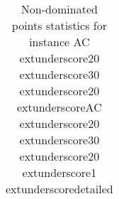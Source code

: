 \begin{table}
\caption{Non-dominated points statistics for instance AC	extunderscore20	extunderscore30	extunderscore20	extunderscoreAC	extunderscore20	extunderscore30	extunderscore20	extunderscore1	extunderscoredetailed}
\label{tab:stats/AC_20_30_20_AC_20_30_20_1_detailed}
\begin{tabular}{}
\toprule
\midrule
\bottomrule
\end{tabular}
\end{table}
